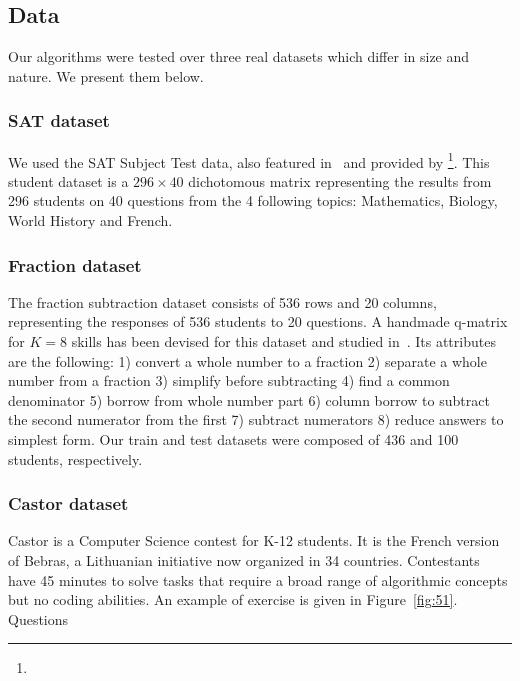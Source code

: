 \documentclass{edm_template}
\begin{document}
\subsection{Data} %

Our algorithms were tested over three real datasets which differ in size and nature. We present them below.

\subsubsection{SAT dataset}

We used the SAT Subject Test data, also featured in~\cite{Winters2005, Desmarais2011} and provided by \phantom{Titus}\footnote{}. This student dataset is a $296 \times 40$ dichotomous matrix representing the results from 296 students on 40 questions from the 4 following topics: Mathematics, Biology, World History and French.

\subsubsection{Fraction dataset}

The fraction subtraction dataset consists of 536 rows and 20 columns, representing the responses of 536 students to 20 questions. A handmade q-matrix for $K = 8$ skills has been devised for this dataset and studied in~\cite{DeLaTorreDouglas2004,DeCarlo2010}. Its attributes are the following:
1) convert a whole number to a fraction
2) separate a whole number from a fraction
3) simplify before subtracting
4) find a common denominator
5) borrow from whole number part
6) column borrow to subtract the second numerator from the first
7) subtract numerators
8) reduce answers to simplest form. Our train and test datasets were composed of 436 and 100 students, respectively.

\subsubsection{Castor dataset}

Castor is a Computer Science contest for K-12 students. It is the French version of Bebras, a Lithuanian initiative now organized in 34 countries. Contestants have 45 minutes to solve tasks that require a broad range of algorithmic concepts but no coding abilities. An example of exercise is given in Figure~\ref{fig:51}. Questions
\end{document}
